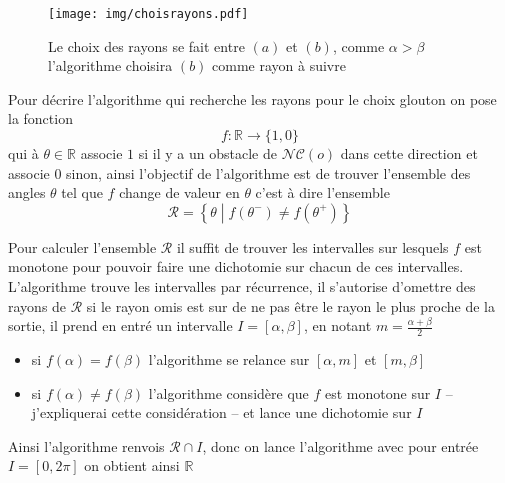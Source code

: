 \documentclass{article}
\newcommand{\noncontour}{\mathcal{NC}}
\newcommand{\R}{\mathbb{R}}
\newcommand{\rayons}{\mathcal{R}}
\begin{document}
\begin{figure}[h]
  \centering
  \texttt{[image: img/choisrayons.pdf]}
  \caption{Le choix des rayons se fait entre $(a)$ et $(b)$, comme $\alpha > \beta$
    l'algorithme choisira $(b)$ comme rayon à suivre}
  \label{fig:choixrayons}
\end{figure}

Pour décrire l'algorithme qui recherche les rayons pour le choix glouton
on pose la fonction
\[
  f : \R \to \{1, 0\}
\]
qui à $\theta \in \R$ associe $1$ si il y a un obstacle de $\noncontour(o)$
dans cette direction et associe $0$ sinon, ainsi l'objectif de l'algorithme
est de trouver l'ensemble des angles $\theta$ tel que
$f$ change de valeur en $\theta$ c'est à dire l'ensemble
\[
  \rayons = \left\{ \theta \middle|
    f\left(\theta^-\right) \neq f\left(\theta^+\right) \right\}
\]


Pour calculer l'ensemble $\rayons$ il suffit de trouver les intervalles
sur lesquels $f$ est monotone pour pouvoir faire une dichotomie sur
chacun de ces intervalles. L'algorithme trouve les intervalles par
récurrence, il s'autorise d'omettre des rayons de $\rayons$ si
le rayon omis est sur de ne pas être le rayon le plus proche de
la sortie, il prend en entré un intervalle $I = [\alpha, \beta]$,
en notant $m = \frac{\alpha + \beta}{2}$
\begin{itemize}
  \item si $f(\alpha) = f(\beta)$ l'algorithme se relance sur $[\alpha, m]$
    et $[m, \beta]$
  \item si $f(\alpha) \neq f(\beta)$ l'algorithme considère que $f$ est
    monotone sur $I$ -- j'expliquerai cette considération -- et lance une
    dichotomie sur $I$
\end{itemize}
Ainsi l'algorithme renvois $\rayons \cap I$, donc on lance l'algorithme
avec pour entrée $I = [0, 2 \pi]$ on obtient ainsi $\R$
\end{document}

